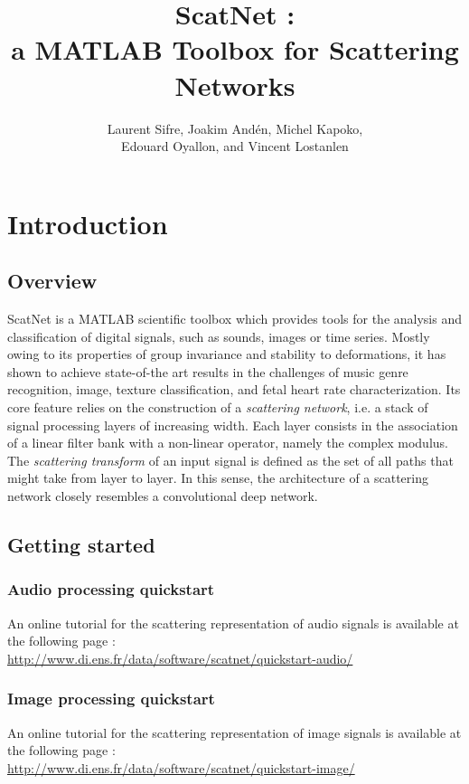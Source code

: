\documentclass{article}
\title{ScatNet : \\ a MATLAB Toolbox for Scattering Networks}
\author{Laurent Sifre, Joakim And\'{e}n, Michel Kapoko, \\ Edouard Oyallon, and Vincent Lostanlen}
\begin{document}
    
\maketitle

\section{Introduction}

\subsection{Overview}
ScatNet is a MATLAB scientific toolbox which provides tools for the analysis and classification of digital signals, such as sounds, images or time series. Mostly owing to its properties of group invariance and stability to deformations, it has shown to achieve state-of-the art results in the challenges of music genre recognition, image, texture classification, and fetal heart rate characterization.
Its core feature relies on the construction of a \emph{scattering network}, i.e. a stack of signal processing layers of increasing width. Each layer consists in the association of a linear filter bank  with a non-linear operator, namely the complex modulus.
The \emph{scattering transform} of an input signal  is defined as the set of all paths that  might take from layer to layer. In this sense, the architecture of a scattering network closely resembles a convolutional deep network.

\subsection{Getting started}
\subsubsection{Audio processing quickstart}
An online tutorial for the scattering representation of audio signals is available at the following page : \\
\hfill \url{http://www.di.ens.fr/data/software/scatnet/quickstart-audio/} \hfill

\subsubsection{Image processing quickstart}
An online tutorial for the scattering representation of image signals is available at the following page : \\
\hfill \url{http://www.di.ens.fr/data/software/scatnet/quickstart-image/} \hfill
\end{document}
